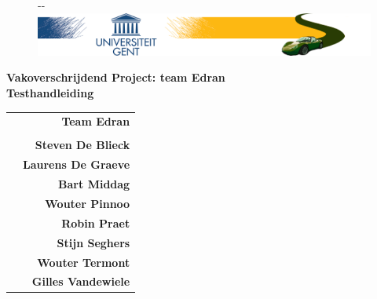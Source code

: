\documentclass[11pt,a4paper,oneside]{article}
\begin{document}
\begin{titlepage}

\thispagestyle{fancy}
\fancyhf{}
\fancyfoot[L]{}
\begin{figure}[!ht]
  \begin{adjustwidth}{-\oddsidemargin-1in}{-\rightmargin}
    \centering
    \includegraphics[width=\paperwidth]{img/banner}
  \end{adjustwidth}
\end{figure}

\vspace{-0.2em}
\begin{center}
\vspace{5cm}
\Huge \textbf{Vakoverschrijdend Project: team Edran\\ Testhandleiding}\\
\vspace{6.0cm}
\large
\begin{tabular}{L! {} R}
& {\LARGE\bf Team Edran} \\
& \\
& {\bf Steven De Blieck} \\
& {\bf Laurens De Graeve} \\
& {\bf Bart Middag} \\
& {\bf Wouter Pinnoo} \\
& {\bf Robin Praet} \\
& {\bf Stijn Seghers} \\
& {\bf Wouter Termont} \\
& {\bf Gilles Vandewiele} \\
\end{tabular}
\end{center}
\end{titlepage}
\restoregeometry
\newpage

\fancyheadoffset[RO,LE]{0in}

\fancyfoot[L]{}
\fancyfoot[C]{\thepage}
\pagestyle{fancy}
\tableofcontents
\end{document}

